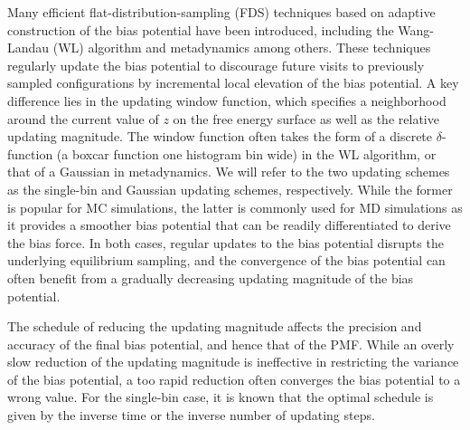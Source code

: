 \documentclass[reprint, superscriptaddress, floatfix]{revtex4-1}
\begin{document}
Many efficient flat-distribution-sampling (FDS) techniques
based on adaptive construction of the bias potential
have been introduced,
including the Wang-Landau (WL) algorithm\cite{
  wang2001, wang2001pre}
and metadynamics\cite{huber1994,
  *laio2002, *laio2008, *barducci2011, *sutto2012, micheletti2004}
among others\cite{yan2004, kim2006, *kim2007, kim2010, junghans2014,
  langfeld2012, pellegrini2014,
  maragliano2006, *abrams2008,
  zheng2010}.
%
These techniques regularly update the bias potential
to discourage future visits to previously sampled configurations
by incremental local elevation of the bias potential.
%
A key difference lies
in the updating window function,
which specifies
a neighborhood around the current value of
$z$ on the free energy surface
as well as the relative updating magnitude.
%
The window function often
takes the form of a discrete
$\delta$-function (a boxcar function one histogram bin wide)
in the WL algorithm,
or that of a Gaussian
in metadynamics.\cite{junghans2014}
%
We will refer to the two updating schemes
as the single-bin
and Gaussian updating schemes, respectively.
%
While the former is popular for MC simulations,\cite{wang2001,
  wang2001pre, kim2006, *kim2007}
the latter is commonly used for MD simulations
as it provides a smoother bias potential
that can be readily differentiated
to derive the bias force.\cite{huber1994,
  *laio2002, *laio2008, *barducci2011, *sutto2012, junghans2014}
%
In both cases,
regular updates to the bias potential
disrupts the underlying equilibrium
sampling,\cite{zhou2005, morozov2007, zhou2008}
and the convergence of the bias potential
can often benefit from a gradually decreasing
updating magnitude of the bias potential.



The schedule of reducing the updating magnitude
affects the precision and accuracy
of the final bias potential,
and hence that of the PMF.\cite{
belardinelli2007, *belardinelli2007jcp, *belardinelli2008, *belardinelli2016,
liang2007,
morozov2007, morozov2009, zhou2008,
komura2012, *caparica2012, *caparica2014,
min2007,
barducci2008, dickson2011, dama2014, poulain2006}
%
While an overly slow reduction of the updating magnitude
is ineffective in restricting the variance of the bias potential,
a too rapid reduction often
converges the bias potential to a wrong value.
%
For the single-bin case, it is known that
the optimal schedule is given by the
inverse time\cite{
belardinelli2007, *belardinelli2007jcp, *belardinelli2008, *belardinelli2016,
liang2007,
morozov2007, morozov2009, zhou2008}
or
the inverse number of updating steps.
\end{document}
